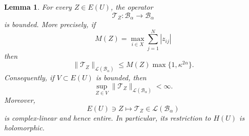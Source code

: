 \documentclass[10pt,a4paper]{amsart}
\newtheorem{lemma}{Lemma}
\newcommand{\T}{\mathbb T}
\begin{document}
\begin{lemma}\label{lem:operator-bounded}
For every \(Z\in E(U)\), the operator
\[
 \mathcal T_Z:\mathcal B_\alpha\longrightarrow\mathcal B_\alpha
\]
is bounded.  More precisely, if
\[
 M(Z)=\max_{i\in X}\sum_{j=1}^N|z_{ij}|
\]
then
\begin{equation}\label{eq:operator-norm-bound}
 \|\mathcal T_Z\|_{\mathcal L(\mathcal B_\alpha)}
 \leq
 M(Z)\max\{1,\kappa^{2\alpha}\}.
\end{equation}
Consequently, if \(V\subset E(U)\) is bounded, then
\[
 \sup_{Z\in V}
 \|\mathcal T_Z\|_{\mathcal L(\mathcal B_\alpha)}
 <\infty.
\]
Moreover,
\[
 E(U)\ni Z\longmapsto
 \mathcal T_Z\in\mathcal L(\mathcal B_\alpha)
\]
is complex-linear and hence entire.  In particular, its restriction
to \(H(U)\) is holomorphic.
\end{lemma}
\end{document}
